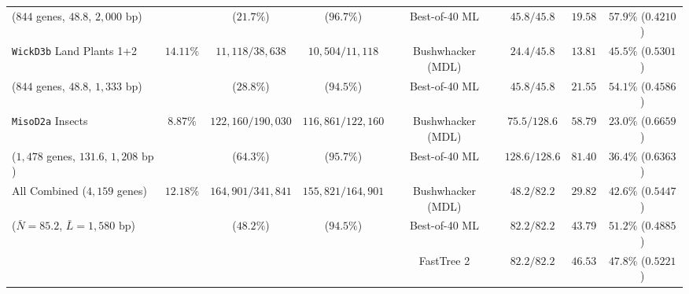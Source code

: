 \documentclass[11pt,a4paper]{article}
\begin{document}
\begin{table}[t!]
{\begin{tabular}{@{}lccccccc@{}}
($844$ genes, $48.8$, $2,000\text{ bp}$) & & ($21.7\%$) & ($96.7\%$) & Best-of-40 ML & $45.8 / 45.8$ & $19.58$ & $57.9\%$ ($0.4210$) \\
\addlinespace
\texttt{WickD3b} Land Plants 1+2 & $14.11\%$ & $11,118 / 38,638$ & $10,504 / 11,118$ & Bushwhacker (MDL) & $24.4 / 45.8$ & $13.81$ & $45.5\%$ ($0.5301$) \\
($844$ genes, $48.8$, $1,333\text{ bp}$) & & ($28.8\%$) & ($94.5\%$) & Best-of-40 ML & $45.8 / 45.8$ & $21.55$ & $54.1\%$ ($0.4586$) \\
\addlinespace
\texttt{MisoD2a} Insects & $8.87\%$ & $122,160 / 190,030$ & $116,861 / 122,160$ & Bushwhacker (MDL) & $75.5 / 128.6$ & $58.79$ & $23.0\%$ ($0.6659$) \\
($1,478$ genes, $131.6$, $1,208\text{ bp}$) & & ($64.3\%$) & ($95.7\%$) & Best-of-40 ML & $128.6 / 128.6$ & $81.40$ & $36.4\%$ ($0.6363$) \\
\midrule
All Combined ($4,159$ genes) & $12.18\%$ & $164,901 / 341,841$ & $155,821 / 164,901$ & Bushwhacker (MDL) & $48.2 / 82.2$ & $29.82$ & $42.6\%$ ($0.5447$) \\
($\bar{N}=85.2$, $\bar{L}=1,580\text{ bp}$) & & ($48.2\%$) & ($94.5\%$) & Best-of-40 ML & $82.2 / 82.2$ & $43.79$ & $51.2\%$ ($0.4885$) \\
& & & & FastTree 2 & $82.2 / 82.2$ & $46.53$ & $47.8\%$ ($0.5221$) \\
\bottomrule
\end{tabular}%
}
\end{table}
\end{document}
